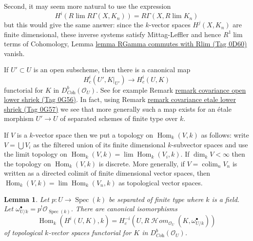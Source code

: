 \documentclass{amsart}
\theoremstyle{plain}
\newtheorem{lemma}[subsection]{Lemma}
\theoremstyle{definition}
\theoremstyle{remark}
\numberwithin{equation}{subsection}
\def\lim{\mathop{\mathrm{lim}}\nolimits}
\def\colim{\mathop{\mathrm{colim}}\nolimits}
\def\Spec{\mathop{\mathrm{Spec}}}
\def\Hom{\mathop{\mathrm{Hom}}\nolimits}
\def\SheafHom{\mathop{\mathcal{H}\!\mathit{om}}\nolimits}
\begin{document}
\medskip\noindent
Second, it may seem more natural to use the expression
$$
H^i(R\lim R\Gamma(X, K_n)) = R\Gamma(X, R\lim K_n)
$$
but this would give the same answer: since the $k$-vector spaces
$H^j(X, K_n)$ are finite dimensional, these inverse systems satisfy
Mittag-Leffler and hence $R^1\lim$ terms of Cohomology, Lemma
\href{https://stacks.math.columbia.edu/tag/0D60}{lemma RGamma commutes with Rlim (Tag 0D60)} vanish.

\medskip\noindent
If $U' \subset U$ is an open subscheme, then there is a canonical map
$$
H^i_c(U', K|_{U'}) \longrightarrow H^i_c(U, K)
$$
functorial for $K$ in $D^b_{\textit{Coh}}(\mathcal{O}_U)$.
See for example Remark \href{https://stacks.math.columbia.edu/tag/0G56}{remark covariance open lower shriek (Tag 0G56)}.
In fact, using Remark \href{https://stacks.math.columbia.edu/tag/0G57}{remark covariance etale lower shriek (Tag 0G57)}
we see that more generally such a map exists for an \'etale morphism
$U' \to U$ of separated schemes of finite type over $k$.

\medskip\noindent
If $V$ is a $k$-vector space then we put a topology on $\Hom_k(V, k)$
as follows: write $V = \bigcup V_i$ as the filtered union of its finite
dimensional $k$-subvector spaces and use the limit topology on
$\Hom_k(V, k) = \lim \Hom_k(V_i, k)$. If $\dim_k V < \infty$ then
the topology on $\Hom_k(V, k)$ is discrete. More generally, if
$V = \colim_n V_n$ is written as a directed colimit of finite dimensional
vector spaces, then $\Hom_k(V, k) = \lim \Hom_k(V_n, k)$ as topological
vector spaces.



\begin{lemma}
\label{lemma-duality-compact-support}
Let $p : U \to \Spec(k)$ be separated of finite type where $k$ is a field.
Let $\omega_{U/k}^\bullet = p^!\mathcal{O}_{\Spec(k)}$.
There are canonical isomorphisms
$$
\Hom_k(H^i(U, K), k) =
H^{-i}_c(U, R\SheafHom_{\mathcal{O}_U}(K, \omega_{U/k}^\bullet))
$$
of topological $k$-vector spaces
functorial for $K$ in $D^b_{\textit{Coh}}(\mathcal{O}_U)$.
\end{lemma}
\end{document}
